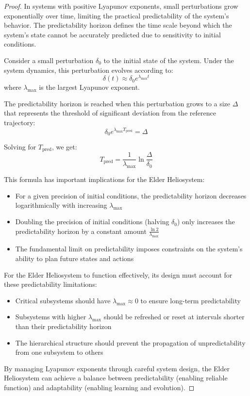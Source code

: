 \begin{proof}
In systems with positive Lyapunov exponents, small perturbations grow exponentially over time, limiting the practical predictability of the system's behavior. The predictability horizon defines the time scale beyond which the system's state cannot be accurately predicted due to sensitivity to initial conditions.

Consider a small perturbation $\delta_0$ to the initial state of the system. Under the system dynamics, this perturbation evolves according to:
\begin{equation}
\delta(t) \approx \delta_0 e^{\lambda_{\max} t}
\end{equation}
where $\lambda_{\max}$ is the largest Lyapunov exponent.

The predictability horizon is reached when this perturbation grows to a size $\Delta$ that represents the threshold of significant deviation from the reference trajectory:
\begin{equation}
\delta_0 e^{\lambda_{\max} T_{\text{pred}}} = \Delta
\end{equation}

Solving for $T_{\text{pred}}$, we get:
\begin{equation}
T_{\text{pred}} = \frac{1}{\lambda_{\max}} \ln \frac{\Delta}{\delta_0}
\end{equation}

This formula has important implications for the Elder Heliosystem:
\begin{itemize}
    \item For a given precision of initial conditions, the predictability horizon decreases logarithmically with increasing $\lambda_{\max}$
    \item Doubling the precision of initial conditions (halving $\delta_0$) only increases the predictability horizon by a constant amount $\frac{\ln 2}{\lambda_{\max}}$
    \item The fundamental limit on predictability imposes constraints on the system's ability to plan future states and actions
\end{itemize}

For the Elder Heliosystem to function effectively, its design must account for these predictability limitations:
\begin{itemize}
    \item Critical subsystems should have $\lambda_{\max} \approx 0$ to ensure long-term predictability
    \item Subsystems with higher $\lambda_{\max}$ should be refreshed or reset at intervals shorter than their predictability horizon
    \item The hierarchical structure should prevent the propagation of unpredictability from one subsystem to others
\end{itemize}

By managing Lyapunov exponents through careful system design, the Elder Heliosystem can achieve a balance between predictability (enabling reliable function) and adaptability (enabling learning and evolution).
\end{proof}

